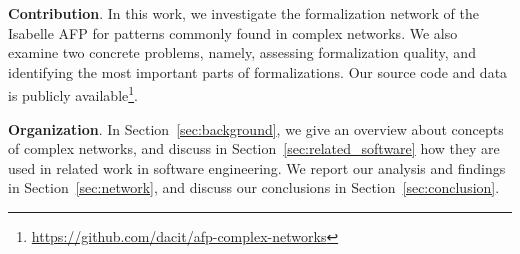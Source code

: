 \textbf{Contribution}.
In this work, we investigate the formalization network of the Isabelle AFP
for patterns commonly found in complex networks.
We also examine two concrete problems, namely,
assessing formalization quality,
and identifying the most important parts of formalizations.
Our source code and data is publicly available\footnote{\url{https://github.com/dacit/afp-complex-networks}}.

\textbf{Organization}.
In Section~\ref{sec:background},
we give an overview about concepts of complex networks,
and discuss in Section~\ref{sec:related_software} how they are used in related work in software engineering.
We report our analysis and findings in Section~\ref{sec:network},
and discuss our conclusions in Section~\ref{sec:conclusion}.